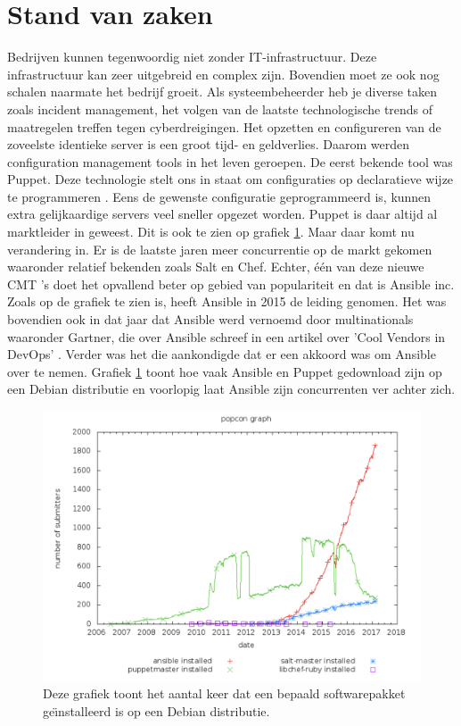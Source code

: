 \section{Stand van zaken}
\label{sec:stand-van-zaken}
Bedrijven kunnen tegenwoordig niet zonder IT-infrastructuur. Deze infrastructuur kan zeer uitgebreid en complex zijn. Bovendien moet ze ook nog schalen naarmate het bedrijf groeit. Als systeembeheerder heb je diverse taken zoals incident management, 
het volgen van de laatste technologische trends of maatregelen treffen tegen cyberdreigingen. Het opzetten en configureren van de zoveelste identieke server is een groot tijd- en geldverlies. Daarom werden configuration management tools in het leven geroepen. De eerst bekende tool was Puppet. Deze technologie stelt ons in staat om configuraties op declaratieve wijze te programmeren \autocite{PuppetDeclaratief}. Eens de gewenste configuratie geprogrammeerd is, kunnen extra gelijkaardige servers veel sneller opgezet worden. 
Puppet is daar altijd al marktleider in geweest. Dit is ook te zien op grafiek \ref{fig:popcon_everybody}. Maar daar komt nu verandering in. Er is de laatste jaren meer concurrentie op de markt gekomen waaronder relatief bekenden zoals Salt en Chef. 
Echter,  \'e\'en van deze nieuwe \gls{CMT} 's doet het opvallend beter op gebied van populariteit en dat is Ansible inc. Zoals op de grafiek te zien is, heeft Ansible in 2015 de leiding genomen. Het was bovendien ook in dat jaar dat Ansible werd vernoemd door multinationals waaronder Gartner, die over Ansible schreef in een artikel over  'Cool Vendors in DevOps' \autocite{gartner}. Verder was het \textcite{redhatovername} die aankondigde dat er een akkoord was om Ansible over te nemen. Grafiek \ref{fig:popcon_everybody} toont hoe vaak Ansible en Puppet gedownload zijn op een Debian distributie en voorlopig laat Ansible zijn concurrenten ver achter zich. 


\begin{figure}
  \includegraphics[width=\linewidth]{img/popcon_everybody.png}
  \caption{Deze grafiek toont het aantal keer dat een bepaald softwarepakket ge\"{\i}nstalleerd is op een Debian distributie. \autocite{popcon}}
  \label{fig:popcon_everybody}
\end{figure}


